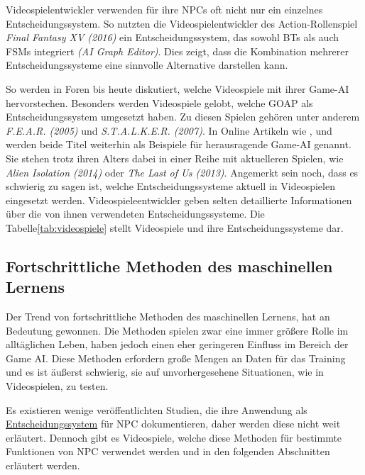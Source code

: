 Videospielentwickler verwenden f\"{u}r ihre NPCs oft nicht nur ein einzelnes Entscheidungssystem. So nutzten die Videospielentwickler des Action-Rollenspiel \textit{Final Fantasy XV (2016)} ein Entscheidungssystem, das sowohl BTs als auch FSMs integriert \textit{(AI Graph Editor)}. Dies zeigt, dass die Kombination mehrerer Entscheidungssysteme eine sinnvolle Alternative darstellen kann.

So werden in Foren bis heute diskutiert, welche Videospiele mit ihrer Game-AI hervorstechen. Besonders werden Videospiele gelobt, welche GOAP als Entscheidungssystem umgesetzt haben. Zu diesen Spielen geh\"{o}ren unter anderem \textit{F.E.A.R. (2005)} und \textit{S.T.A.L.K.E.R. (2007)}.
In Online Artikeln wie \autocite{vanceai}, \autocite{techopedia} und \autocite{gamerant} werden beide Titel weiterhin als Beispiele f\"{u}r herausragende Game-AI genannt. Sie stehen trotz ihren Alters dabei in einer Reihe mit aktuelleren Spielen, wie \textit{Alien Isolation (2014)} oder \textit{The Last of Us (2013)}.
Angemerkt sein noch, dass es schwierig zu sagen ist, welche Entscheidungssysteme aktuell in Videospielen eingesetzt werden. Videospieleentwickler geben selten detaillierte Informationen \"{u}ber die von ihnen verwendeten Entscheidungssysteme. Die Tabelle\ref{tab:videospiele} stellt Videospiele und ihre Entscheidungssysteme dar.


\subsection{Fortschrittliche Methoden des maschinellen Lernens}
\label{chap:sota ml}

Der Trend von fortschrittliche Methoden des maschinellen Lernens, hat an Bedeutung gewonnen. Die Methoden spielen zwar eine immer gr\"{o}\ss{}ere Rolle im allt\"{a}glichen Leben, haben jedoch einen eher geringeren Einfluss im Bereich der Game AI. Diese Methoden erfordern gro\ss{}e Mengen an Daten f\"{u}r das Training und es ist \"{a}u\ss{}erst schwierig, sie auf unvorhergesehene Situationen, wie in Videospielen, zu testen. \autocite{U2023}

Es existieren wenige ver\"{o}ffentlichten Studien, die ihre Anwendung als \hyperref[chap:entscheidungssysteme]{Entscheidungssystem} f\"{u}r NPC dokumentieren, \autocite{U2023} daher werden diese nicht weit erl\"{a}utert. Dennoch gibt es Videospiele, welche diese Methoden f\"{u}r bestimmte Funktionen von NPC verwendet werden und in den folgenden Abschnitten erl\"{a}utert werden.

